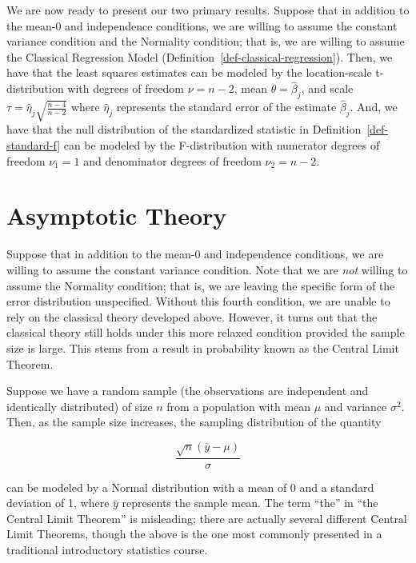 \documentclass[
  letterpaper,
  DIV=11,
  numbers=noendperiod]{scrreprt}
\theoremstyle{plain}
\theoremstyle{definition}
\theoremstyle{definition}
\theoremstyle{remark}
\begin{document}
We are now ready to present our two primary results. Suppose that in
addition to the mean-0 and independence conditions, we are willing to
assume the constant variance condition and the Normality condition; that
is, we are willing to assume the Classical Regression Model
(Definition~\ref{def-classical-regression}). Then, we have that the
least squares estimates can be modeled by the location-scale
t-distribution with degrees of freedom \(\nu = n - 2\), mean
\(\theta = \widehat{\beta}_j\), and scale
\(\tau = \widehat{\eta}_j\sqrt{\frac{n - 4}{n - 2}}\) where
\(\widehat{\eta}_j\) represents the standard error of the estimate
\(\widehat{\beta}_j\). And, we have that the null distribution of the
standardized statistic in Definition~\ref{def-standard-f} can be modeled
by the F-distribution with numerator degrees of freedom \(\nu_1 = 1\)
and denominator degrees of freedom \(\nu_2 = n - 2\).

\section{Asymptotic Theory}\label{asymptotic-theory}

Suppose that in addition to the mean-0 and independence conditions, we
are willing to assume the constant variance condition. Note that we are
\emph{not} willing to assume the Normality condition; that is, we are
leaving the specific form of the error distribution unspecified. Without
this fourth condition, we are unable to rely on the classical theory
developed above. However, it turns out that the classical theory still
holds under this more relaxed condition provided the sample size is
large. This stems from a result in probability known as the Central
Limit Theorem.

Suppose we have a random sample (the observations are independent and
identically distributed) of size \(n\) from a population with mean
\(\mu\) and variance \(\sigma^2\). Then, as the sample size increases,
the sampling distribution of the quantity

\[\frac{\sqrt{n} \left(\bar{y} - \mu\right)}{\sigma}\]

can be modeled by a Normal distribution with a mean of 0 and a standard
deviation of 1, where \(\bar{y}\) represents the sample mean. The term
``the'' in ``the Central Limit Theorem'' is misleading; there are
actually several different Central Limit Theorems, though the above is
the one most commonly presented in a traditional introductory statistics
course.
\end{document}
